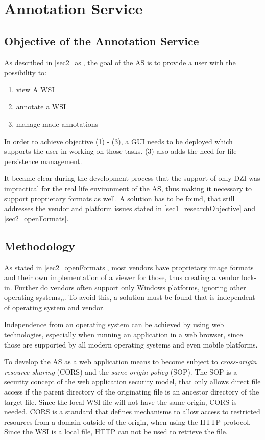 \chapter{Annotation Service}
\label{sec4_as}

\section{Objective of the Annotation Service}
\label{sec4_objective}
As described in \ref{sec2_as}, the goal of the AS is to provide a user with the possibility to:
\begin{enumerate}[(1)]
	\item view A WSI
	\item annotate a WSI
	\item manage made annotations
\end{enumerate}

In order to achieve objective (1) - (3), a GUI needs to be deployed which supports the user in working on those tasks. (3) also adds the need for file persistence management.

It became clear during the development process that the support of only DZI was impractical for the real life environment of the AS, thus making it necessary to support proprietary formats as well. A solution has to be found, that still addresses the vendor and platform issues stated in \ref{sec1_researchObjective} and \ref{sec2_openFormats}.


\section{Methodology}
\label{sec4_methodology}
As stated in \ref{sec2_openFormats}, most vendors have proprietary image formats and their own implementation of a viewer for those, thus creating a vendor lock-in. Further do vendors often support only Windows platforms, ignoring other operating systems\cite{Cornish13},\cite{DICOM10},\cite{Farahanil15}. To avoid this, a solution must be found that is independent of operating system and vendor.

Independence from an operating system can be achieved by using web technologies, especially when running an application in a web browser, since those are supported by all modern operating systems and even mobile platforms\cite{Tseytlin14}.

To develop the AS as a web application means to become subject to \emph{cross-origin resource sharing} (CORS)\cite{Kesteren14} and the \emph{same-origin policy} (SOP)\cite{web:mdn}. The SOP is a security concept of the web application security model, that only allows direct file access if the parent directory of the originating file is an ancestor directory of the target file\cite{web:mdn}. Since the local WSI file will not have the same origin, CORS is needed. CORS is a standard that defines mechanisms to allow access to restricted resources from a domain outside of the origin, when using the HTTP protocol\cite{Kesteren14}. Since the WSI is a local file, HTTP can not be used to retrieve the file.

